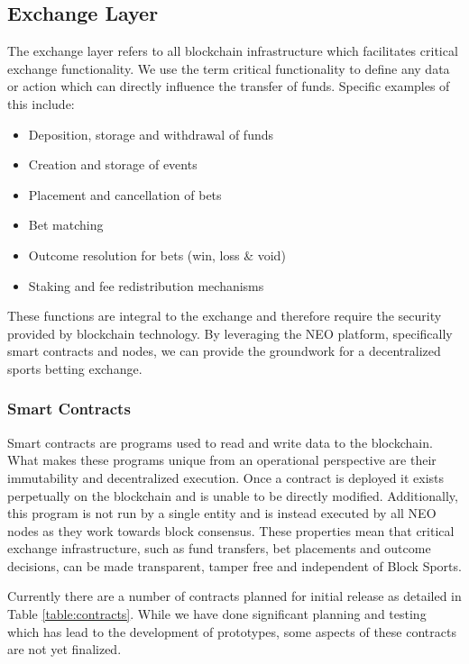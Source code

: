 \documentclass{article}
\begin{document}
	\subsection{Exchange Layer}
	
The exchange layer refers to all blockchain infrastructure which facilitates critical exchange functionality. We use the term critical functionality to define any data or action which can directly influence the transfer of funds. Specific examples of this include:

\begin{itemize}
	\item Deposition, storage and withdrawal of funds
	\item Creation and storage of events
	\item Placement and cancellation of bets
	\item Bet matching
	\item Outcome resolution for bets (win, loss \& void)
	\item Staking and fee redistribution mechanisms
\end{itemize}

These functions are integral to the exchange and therefore require the security provided by blockchain technology. By leveraging the NEO platform, specifically smart contracts and nodes, we can provide the groundwork for a decentralized sports betting exchange.



		\subsubsection{Smart Contracts}
Smart contracts are programs used to read and write data to the blockchain. What makes these programs unique from an operational perspective are their immutability and decentralized execution. Once a contract is deployed it exists perpetually on the blockchain and is unable to be directly modified. Additionally, this program is not run by a single entity and is instead executed by all NEO nodes as they work towards block consensus. These properties mean that critical exchange infrastructure, such as fund transfers, bet placements and outcome decisions, can be made transparent, tamper free and independent of Block Sports.
 
Currently there are a number of contracts planned for initial release as detailed in Table \ref{table:contracts}. While we have done significant planning and testing which has lead to the development of prototypes, some aspects of these contracts are not yet finalized. 
\end{document}

